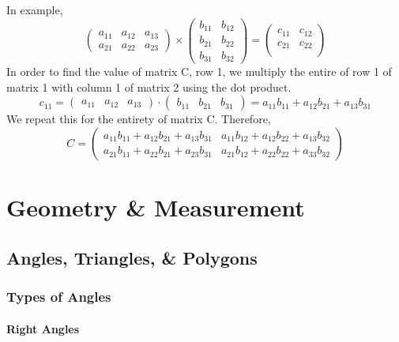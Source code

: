 \documentclass{report}
\begin{document}
\begin{flushleft}
In example, 
\begin{equation}
	\begin{pmatrix}
	a_{11} & a_{12} & a_{13} \\
	a_{21} & a_{22} & a_{23}
	\end{pmatrix}
	\times
	\begin{pmatrix}
	b_{11} & b_{12}\\
	b_{21} & b_{22} \\
	b_{31} & b_{32}
	\end{pmatrix}
	=
	\begin{pmatrix}
	c_{11} & c_{12} \\
	c_{21} & c_{22} \\
	\end{pmatrix}
\end{equation}
In order to find the value of matrix C, row 1, we multiply the entire of row 1 of matrix 1 with column 1 of matrix 2 using the dot product.
\begin{equation}
c_{11} = 
\begin{pmatrix}
a_{11} & a_{12} & a_{13}
\end{pmatrix}
\cdot
\begin{pmatrix}
b_{11} & b_{21} & b_{31}
\end{pmatrix}
=
a_{11}b_{11} + a_{12}b_{21} + a_{13}b_{31}
\end{equation}
We repeat this for the entirety of matrix C. Therefore,
\begin{equation}
C =
\begin{pmatrix}
a_{11}b_{11} + a_{12}b_{21} + a_{13}b_{31} & a_{11}b_{12} + a_{12}b_{22} + a_{13}b_{32} \\
a_{21}b_{11} + a_{22}b_{21} + a_{23}b_{31} & a_{21}b_{12} + a_{22}b_{22} + a_{33}b_{32} 
\end{pmatrix}
\end{equation}

\chapter{Geometry \& Measurement}
\section{Angles, Triangles, \& Polygons}
\subsection{Types of Angles}
\subsubsection{Right Angles}


\end{flushleft}
\end{document}
